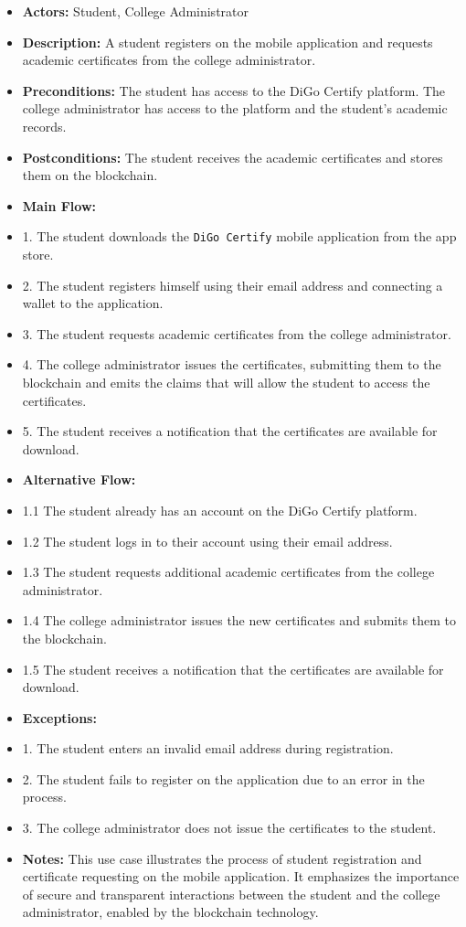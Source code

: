 \begin{itemize}

    \item \textbf{Actors:} Student, College Administrator
    \item \textbf{Description:} A student registers on the mobile application and requests academic certificates from the college administrator.
    \item \textbf{Preconditions:} The student has access to the DiGo Certify platform. The college administrator has access to the platform and the student's academic records.
    \item \textbf{Postconditions:} The student receives the academic certificates and stores them on the blockchain.
    \item \textbf{Main Flow:}
    \item 1. The student downloads the \texttt{DiGo Certify} mobile application from the app store.
    \item 2. The student registers himself using their email address and connecting a wallet to the application.
    \item 3. The student requests academic certificates from the college administrator.
    \item 4. The college administrator issues the certificates, submitting them to the blockchain and
          emits the claims that will allow the student to access the certificates.
    \item 5. The student receives a notification that the certificates are available for download.
    \item \textbf{Alternative Flow:}
    \item 1.1 The student already has an account on the DiGo Certify platform.
    \item 1.2 The student logs in to their account using their email address.
    \item 1.3 The student requests additional academic certificates from the college administrator.
    \item 1.4 The college administrator issues the new certificates and submits them to the blockchain.
    \item 1.5 The student receives a notification that the certificates are available for download.
    \item \textbf{Exceptions:}
    \item 1. The student enters an invalid email address during registration.
    \item 2. The student fails to register on the application due to an error in the process.
    \item 3. The college administrator does not issue the certificates to the student.
    \item \textbf{Notes:} This use case illustrates the process of student registration and certificate requesting on the mobile application. It emphasizes the importance of secure and transparent interactions between the student and the college administrator, enabled by the blockchain technology.
\end{itemize}

